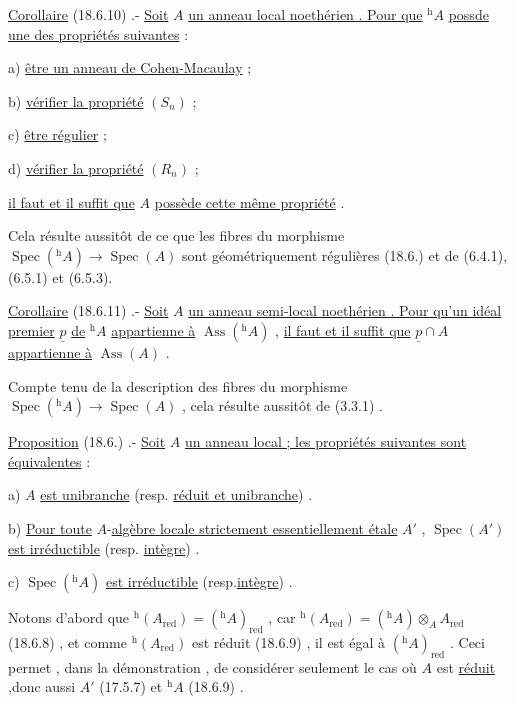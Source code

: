 \uline{Corollaire} (18.6.10) .- \uline{Soit} $A$ \uline{un anneau local noethérien . Pour que} $ {}^{\mathrm h}A$ \uline{possde une des propriétés suivantes} :

a) \uline{être un anneau de Cohen-Macaulay} ;

b) \uline{vérifier la propriété} $(S_n)$ ;

c) \uline{être régulier} ;

d) \uline{vérifier la propriété} $(R_n)$ ;

\uline{il faut et il suffit que} $A$ \uline{possède cette même propriété} .

Cela résulte aussitôt de ce que les fibres du morphisme $\operatorname{Spec}({}^{\mathrm h}A)\to\operatorname{Spec}(A)$
sont géométriquement régulières (18.6.) et de (6.4.1),(6.5.1) et (6.5.3).

\uline{Corollaire} (18.6.11) .- \uline{Soit} $A$ \uline{un anneau semi-local noethérien . Pour qu'un
idéal premier} $\underline p$ \uline{de} $ {}^{\mathrm h}A$ \uline{appartienne à} $\operatorname{Ass}({}^{\mathrm h}A)$ , \uline{il faut et il suffit que} $\underline p\cap A$
\uline{appartienne à} $\operatorname{Ass}(A)$ .

Compte tenu de la description des fibres du morphisme $\operatorname{Spec}({}^{\mathrm h}A)\to\operatorname{Spec}(A)$ ,
cela résulte aussitôt de (3.3.1) .

\uline{Proposition} (18.6.) .- \uline{Soit} $A$ \uline{un anneau local ; les propriétés suivantes
sont équivalentes} :

a) $A$ \uline{est unibranche} (resp. \uline{réduit et unibranche}) .

b) \uline{Pour toute} $A$-\uline{algèbre locale strictement essentiellement étale} $A'$ ,
$\operatorname{Spec}(A')$ \uline{est irréductible} (resp. \uline{intègre}) .

c) $\operatorname{Spec}({}^{\mathrm h}A)$ \uline{est irréductible} (resp.\uline{intègre}) .

Notons d'abord que $ {}^{\mathrm h}(A_{\mathrm{red}})=({}^{\mathrm h}A)_{\mathrm{red}}$ , car  $ {}^{\mathrm h}(A_{\mathrm{red}})=({}^{\mathrm h}A)\otimes_A A_{\mathrm{red}}$ (18.6.8) , et
comme $ {}^{\mathrm h}(A_{\mathrm{red}})$ est réduit (18.6.9) , il est égal à $({}^{\mathrm h}A)_{\mathrm{red}}$ . Ceci permet ,
dans la démonstration , de considérer seulement le cas où $A$ est \uline{réduit} ,donc
aussi $A'$ (17.5.7) et $ {}^{\mathrm h}A$ (18.6.9) .

